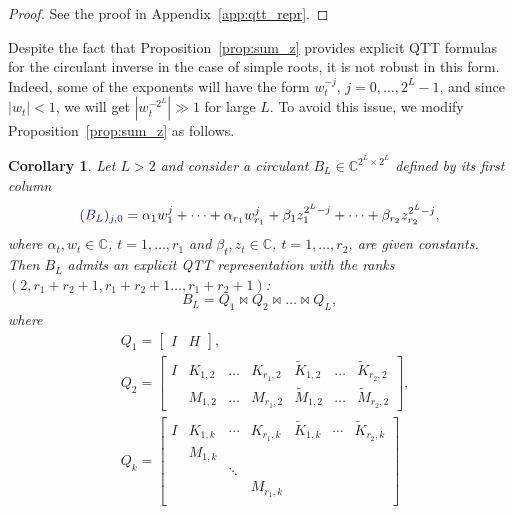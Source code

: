 \documentclass[a4paper]{article}
\newtheorem{corollary}{Corollary}[section]
\newcommand{\LL}{L}
\newcommand{\invA}{B}
\newcommand{\KK}{K}
\newcommand{\KKother}{\widetilde{K}}
\newcommand{\MM}{M}
\newcommand{\MMother}{\widetilde{M}}
\begin{document}
\begin{proof}
	    See the proof in Appendix~\ref{app:qtt_repr}.
	\end{proof}


Despite the fact that Proposition~\ref{prop:sum_z} provides explicit QTT formulas for the circulant inverse in the case of simple roots, it is not robust in this form.
Indeed, some of the exponents will have the form $w_t^{-j}$, $j=0,\dots,2^{\LL}-1$, and since $|w_{t}|<1$, we will get $|w_t^{-2^{\LL}}| \gg 1$ for large $\LL$.
To avoid this issue, we modify Proposition~\ref{prop:sum_z} as follows. 

\begin{corollary} \label{prop:sum_z_stable}
    Let $\LL >2$ and consider a circulant $\invA_\LL \in \mathbb{C}^{2^\LL \times 2^\LL}$ defined by its first column
    \[
        \textcolor{blue}{(\invA_\LL)_{j, 0}} = \alpha_1 w_1^j + \dots + \alpha_{r_1} w_{r_1}^j + \beta_1 z_1^{2^{\LL}-j} + \dots + \beta_{r_2} z_{r_2}^{2^{\LL}-j},
    \]
    where $\alpha_t,w_t\in\mathbb{C}$, $t=1,\dots,r_1$ and $\beta_t,z_t\in\mathbb{C}$, $t=1,\dots,r_2$, are given constants.
    Then $\invA_\LL$ admits an explicit QTT representation with the ranks $(2,r_1+r_2+1,r_1 + r_2 +1\dots, r_1 + r_2 +1)$:
    \[
        \invA_\LL = Q_1 \Join Q_2\Join \dots \Join Q_\LL,
    \]
    where 
    \[
    \begin{split}
        &Q_1 = 
        \begin{bmatrix}
            I & H
        \end{bmatrix},
        \\
        &Q_2 = 
        \begin{bmatrix}
            I
            &
            \KK_{1,2} & \dots & \KK_{r_1,2} 
            &
            \KKother_{1,2} & \dots & \KKother_{r_2,2}
            \\
             &
             \MM_{1,2} & \dots & \MM_{r_1,2}
             &
             \MMother_{1,2} & \dots & \MMother_{r_2,2}
        \end{bmatrix},
        \\
    &Q_k = 
    \begin{bmatrix}
        I
        &
        \KK_{1,k} & \cdots & \KK_{r_1,k}
        &
        \KKother_{1,k} & \cdots & \KKother_{r_2,k}
        \\
         &
         \MM_{1,k} & & & & & \\
         & & \ddots  & & & \\
         & & & \MM_{r_1,k} & & & \\

\end{bmatrix}
\end{split}\]
\end{corollary}
\end{document}
